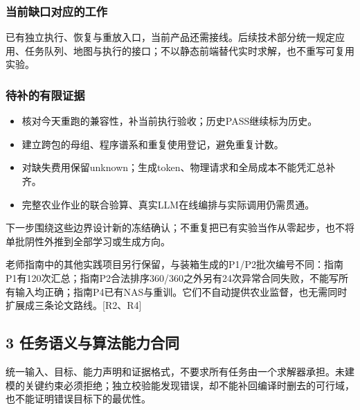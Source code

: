 \documentclass[11pt,a4paper]{article}
\newcommand{\bodytext}[1]{#1\par}
\begin{document}
\subsubsection{当前缺口对应的工作}
\bodytext{已有独立执行、恢复与重放入口，当前产品还需接线。后续技术部分统一规定应用、任务队列、地图与执行的接口；不以静态前端替代实时求解，也不重写可复用实验。}
\subsubsection{待补的有限证据}
\begin{itemize}
\item 核对今天重跑的兼容性，补当前执行验收；历史PASS继续标为历史。
\item 建立跨包的母组、程序谱系和重复使用登记，避免重复计数。
\item 对缺失费用保留unknown；生成token、物理请求和全局成本不能凭汇总补齐。
\item 完整农业作业的联合验算、真实LLM在线编排与实际调用仍需贯通。
\end{itemize}
\bodytext{下一步围绕这些边界设计新的冻结确认；不重复把已有实验当作从零起步，也不将单批阴性外推到全部学习或生成方向。}
\bodytext{老师指南中的其他实践项目另行保留，与装箱生成的P1/\allowbreak{}P2批次编号不同：指南P1有120次汇总；指南P2合法排序360/\allowbreak{}360之外另有24次异常合同失败，不能写所有输入均正确；指南P4已有NAS与重训。它们不自动提供农业监督，也无需同时扩展成三条论文路线。[R2、R4]}
\subsection{3  任务语义与算法能力合同}
\bodytext{统一输入、目标、能力声明和证据格式，不要求所有任务由一个求解器承担。未建模的关键约束必须拒绝；独立校验能发现错误，却不能补回编译时删去的可行域，也不能证明错误目标下的最优性。}
\begingroup
\fontsize{9.6}{14.6}\selectfont
\setlength{\tabcolsep}{4pt}
\renewcommand{\arraystretch}{1.18}
\end{document}
